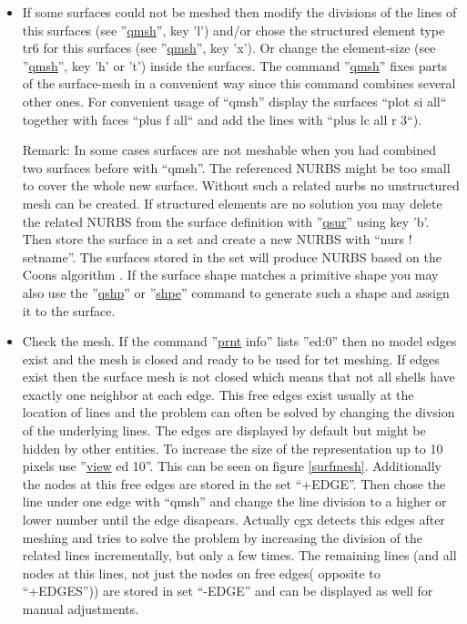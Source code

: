 \documentclass{article}
\providecommand{\htmlref}[2]{\hyperref[#2]{#1}}
\begin{document}
\begin{appendix}
\begin{itemize}
\item If some surfaces could not be meshed then modify the divisions of the lines of this surfaces (see ''\htmlref{qmsh}{qmsh}'', key 'l') and/or chose the structured element type tr6 for this surfaces (see ''\htmlref{qmsh}{qmsh}'', key 'x'). Or change the element-size (see ''\htmlref{qmsh}{qmsh}'', key 'h' or 't') inside the surfaces. The command ''\htmlref{qmsh}{qmsh}'' fixes parts of the surface-mesh in a convenient way since this command combines several other ones. For convenient usage of ``qmsh'' display the surfaces ``plot si all`` together with faces ``plus f all`` and add the lines with ``plus lc all r 3``).

Remark: In some cases surfaces are not meshable when you had combined two surfaces before with ``qmsh''. The referenced NURBS might be too small to cover the whole new surface. Without such a related nurbs no unstructured mesh can be created. If structured elements are no solution you may delete the related NURBS from the surface definition with ''\htmlref{qsur}{qsur}'' using key 'b'. Then store the surface in a set and create a new NURBS with ``nurs ! setname''. The surfaces stored in the set will produce NURBS based on the Coons algorithm \cite{Coons}. If the surface shape matches a primitive shape you may also use the ''\htmlref{qshp}{qshp}'' or ''\htmlref{shpe}{shpe}'' command to generate such a shape and assign it to the surface.

\item Check the mesh. If the command ''\htmlref{prnt}{prnt} info'' lists ''ed:0'' then no model edges exist and the mesh is closed and ready to be used for tet meshing. If edges exist then the surface mesh is not closed which means that not all shells have exactly one neighbor at each edge. This free edges exist usually at the location of lines and the problem can often be solved by changing the divsion of the underlying lines. The edges are displayed by default but might be hidden by other entities. To increase the size of the representation up to 10 pixels use ''\htmlref{view}{view} ed 10''. This can be seen on figure \ref{surfmesh}. Additionally the nodes at this free edges are stored in the set ``+EDGE''. Then chose the line under one edge with ``qmsh'' and change the line division to a higher or lower number until the edge disapears. Actually cgx detects this edges after meshing and tries to solve the problem by increasing the division of the related lines incrementally, but only a few times. The remaining lines (and all nodes at this lines, not just the nodes on free edges( opposite to ``+EDGES'')) are stored in set ``-EDGE'' and can be displayed as well for manual adjustments. 
  

\end{itemize}
\end{appendix}
\end{document}
